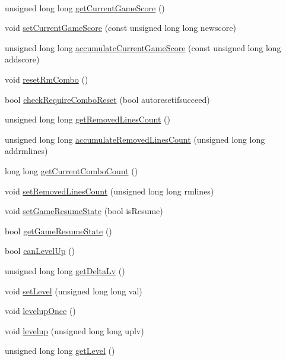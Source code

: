 \begin{DoxyCompactItemize}
$$\item 
unsigned long long \hyperlink{class_tetris_1_1_users_1_1_game_user_a93bde8123ee0dc9333d62a44b904023c}{get\+Current\+Game\+Score} ()
\item 
void \hyperlink{class_tetris_1_1_users_1_1_game_user_aa37f3ed5891a4efecc09f92188b8a9cd}{set\+Current\+Game\+Score} (const unsigned long long newscore)
\item 
unsigned long long \hyperlink{class_tetris_1_1_users_1_1_game_user_a5808d26769ba24d9e6435e40d3feb7af}{accumulate\+Current\+Game\+Score} (const unsigned long long addscore)
\item 
void \hyperlink{class_tetris_1_1_users_1_1_game_user_a91a7cf9f13654b44b43ac0d2f1125206}{reset\+Rm\+Combo} ()
\item 
bool \hyperlink{class_tetris_1_1_users_1_1_game_user_a82ea0dfdb99643a1b577a22f5e504346}{check\+Require\+Combo\+Reset} (bool autoresetifsucceed)
\item 
unsigned long long \hyperlink{class_tetris_1_1_users_1_1_game_user_a5912def4d9d77adbb4323b35366724af}{get\+Removed\+Lines\+Count} ()
\item 
unsigned long long \hyperlink{class_tetris_1_1_users_1_1_game_user_a89c6053fbb03b4fbfcd3fec883a87765}{accumulate\+Removed\+Lines\+Count} (unsigned long long addrmlines)
\item 
long long \hyperlink{class_tetris_1_1_users_1_1_game_user_a761f78f405c3d4445ae147b2c11e8364}{get\+Current\+Combo\+Count} ()
\item 
void \hyperlink{class_tetris_1_1_users_1_1_game_user_a298debc64e974b4f626e8f77687ea503}{set\+Removed\+Lines\+Count} (unsigned long long rmlines)
\item 
void \hyperlink{class_tetris_1_1_users_1_1_game_user_a10d5ff75a132346fd1947ea14bcea7ab}{set\+Game\+Resume\+State} (bool is\+Resume)
\item 
bool \hyperlink{class_tetris_1_1_users_1_1_game_user_a12cc139cfa5d31708d0e53b07e110ab3}{get\+Game\+Resume\+State} ()
\item 
bool \hyperlink{class_tetris_1_1_users_1_1_game_user_a93e385fd100ac5ec2f6f6b9f0fab2950}{can\+Level\+Up} ()
\item 
unsigned long long \hyperlink{class_tetris_1_1_users_1_1_game_user_a1a55323cff69015417ad4d214b985724}{get\+Delta\+Lv} ()
\item 
void \hyperlink{class_tetris_1_1_users_1_1_game_user_a40603ad69564036b53b99cdd67fe5451}{set\+Level} (unsigned long long val)
\item 
void \hyperlink{class_tetris_1_1_users_1_1_game_user_af8ec964e749d90e60df8a4d7c63b4017}{levelup\+Once} ()
\item 
void \hyperlink{class_tetris_1_1_users_1_1_game_user_ae5f2fd276485ee3f677896c3cc03462a}{levelup} (unsigned long long uplv)
\item 
unsigned long long \hyperlink{class_tetris_1_1_users_1_1_game_user_ae052e17a9bdcb0d8bc98c287592f7d7b}{get\+Level} ()
\end{DoxyCompactItemize}
